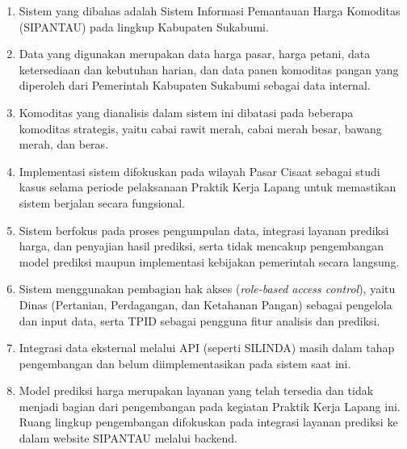 \begin{enumerate}
\item Sistem yang dibahas adalah Sistem Informasi Pemantauan Harga Komoditas (SIPANTAU) pada lingkup Kabupaten Sukabumi.
\item Data yang digunakan merupakan data harga pasar, harga petani, data ketersediaan dan kebutuhan harian, dan data panen komoditas pangan yang diperoleh dari Pemerintah Kabupaten Sukabumi sebagai data internal.
\item Komoditas yang dianalisis dalam sistem ini dibatasi pada beberapa komoditas strategis, yaitu cabai rawit merah, cabai merah besar, bawang merah, dan beras.
\item Implementasi sistem difokuskan pada wilayah Pasar Cisaat sebagai studi kasus selama periode pelaksanaan Praktik Kerja Lapang untuk memastikan sistem berjalan secara fungsional.
\item Sistem berfokus pada proses pengumpulan data, integrasi layanan prediksi harga, dan penyajian hasil prediksi, serta tidak mencakup pengembangan model prediksi maupun implementasi kebijakan pemerintah secara langsung.
\item Sistem menggunakan pembagian hak akses (\emph{role-based access control}), yaitu Dinas (Pertanian, Perdagangan, dan Ketahanan Pangan) sebagai pengelola dan input data, serta TPID sebagai pengguna fitur analisis dan prediksi.
\item Integrasi data eksternal melalui API (seperti SILINDA) masih dalam tahap pengembangan dan belum diimplementasikan pada sistem saat ini.
\item Model prediksi harga merupakan layanan yang telah tersedia dan tidak menjadi bagian dari pengembangan pada kegiatan Praktik Kerja Lapang ini. Ruang lingkup pengembangan difokuskan pada integrasi layanan prediksi ke dalam website SIPANTAU melalui backend.
\end{enumerate}







